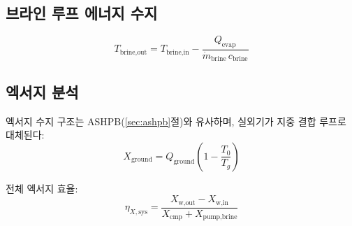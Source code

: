 \subsection{브라인 루프 에너지 수지}

\begin{equation}\label{eq:gshp-brine}
  T_\text{brine,out} = T_\text{brine,in} - \frac{Q_\text{evap}}{\dot{m}_\text{brine}\,c_\text{brine}}
\end{equation}

\subsection{엑서지 분석}

엑서지 수지 구조는 ASHPB(\ref{sec:ashpb}절)와 유사하며, 실외기가 지중 결합 루프로 대체된다:
\begin{equation}\label{eq:gshp-Xground}
  X_\text{ground} = Q_\text{ground}\left(1 - \frac{T_0}{T_g}\right)
\end{equation}

전체 엑서지 효율:
\begin{equation}\label{eq:gshp-etaX}
  \eta_{X,\text{sys}} = \frac{X_\text{w,out} - X_\text{w,in}}{X_\text{cmp} + X_\text{pump,brine}}
\end{equation}

